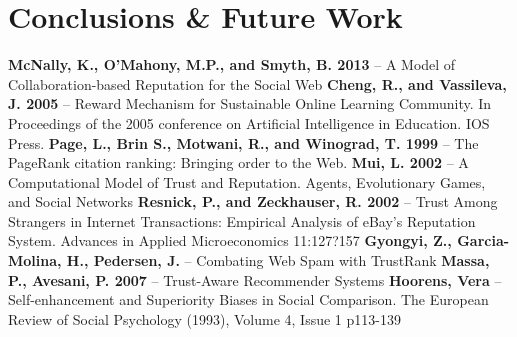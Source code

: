 \documentclass[]{final_report}
\begin{document}
\chapter{Conclusions \& Future Work}

\newpage
\raggedright
\textbf{McNally, K., O'Mahony, M.P., and Smyth, B. 2013} -- A Model of Collaboration-based Reputation for the Social Web
\linebreak
\linebreak
\textbf{Cheng, R., and Vassileva, J. 2005} -- Reward Mechanism for Sustainable Online Learning Community. In Proceedings of the 2005 conference on Artificial Intelligence in Education. IOS Press.
\linebreak
\linebreak
\textbf{Page, L., Brin S., Motwani, R., and Winograd, T. 1999} -- The PageRank citation ranking: Bringing order to the Web.
\linebreak
\linebreak
\textbf{Mui, L. 2002} -- A Computational Model of Trust and Reputation. Agents, Evolutionary Games, and Social Networks
\linebreak
\linebreak
\textbf{Resnick, P., and Zeckhauser, R. 2002} -- Trust Among Strangers in Internet Transactions: Empirical Analysis of eBay's Reputation System. Advances in Applied Microeconomics 11:127?157
\linebreak
\linebreak
\textbf{Gyongyi, Z., Garcia-Molina, H., Pedersen, J.} -- Combating Web Spam with TrustRank
\linebreak
\linebreak
\textbf{Massa, P., Avesani, P. 2007} -- Trust-Aware Recommender Systems
\linebreak
\linebreak
\textbf{Hoorens, Vera} -- Self-enhancement and Superiority Biases in Social Comparison. The European Review of Social Psychology (1993), Volume 4, Issue 1 p113-139



\label{endpage}
\end{document}
